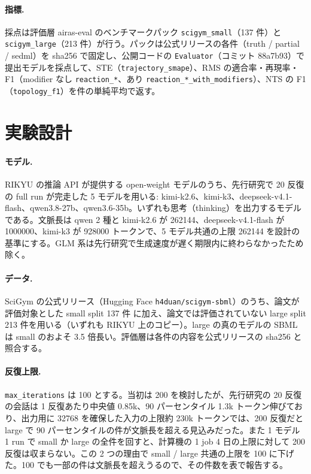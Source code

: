 \documentclass{article}
\begin{document}
\paragraph{指標.}
採点は評価層 airas-eval のベンチマークパック \texttt{scigym\_small}（137 件）と \texttt{scigym\_large}（213 件）が行う。パックは公式リリースの各件（truth / partial / sedml）を sha256 で固定し、公開コードの \texttt{Evaluator}（コミット 88a7b93）で提出モデルを採点して、STE（\texttt{trajectory\_smape}）、RMS の適合率・再現率・F1（modifier なし \texttt{reaction\_*}、あり \texttt{reaction\_*\_with\_modifiers}）、NTS の F1（\texttt{topology\_f1}）を件の単純平均で返す。

\section{実験設計}
\label{sec:design}
\paragraph{モデル.}
RIKYU の推論 API が提供する open-weight モデルのうち、先行研究で 20 反復の full run が完走した 5 モデルを用いる: kimi-k2.6、kimi-k3、deepseek-v4.1-flash、qwen3.8-27b、qwen3.6-35b。いずれも思考（thinking）を出力するモデルである。文脈長は qwen 2 種と kimi-k2.6 が 262144、deepseek-v4.1-flash が 1000000、kimi-k3 が 928000 トークンで、5 モデル共通の上限 262144 を設計の基準にする。GLM 系は先行研究で生成速度が遅く期限内に終わらなかったため除く。

\paragraph{データ.}
SciGym の公式リリース（Hugging Face \texttt{h4duan/scigym-sbml}）のうち、論文が評価対象とした small split 137 件 \cite[s1.p2]{duan-2025-measuring} に加え、論文では評価されていない large split 213 件を用いる（いずれも RIKYU 上のコピー）。large の真のモデルの SBML は small のおよそ 3.5 倍長い。評価層は各件の内容を公式リリースの sha256 と照合する。

\paragraph{反復上限.}
\texttt{max\_iterations} は 100 とする。当初は 200 を検討したが、先行研究の 20 反復の会話は 1 反復あたり中央値 0.85k、90 パーセンタイル 1.3k トークン伸びており、出力用に 32768 を確保した入力の上限約 230k トークンでは、200 反復だと large で 90 パーセンタイルの件が文脈長を超える見込みだった。また 1 モデル 1 run で small か large の全件を回すと、計算機の 1 job 4 日の上限に対して 200 反復は収まらない。この 2 つの理由で small / large 共通の上限を 100 に下げた。100 でも一部の件は文脈長を超えうるので、その件数を表で報告する。
\end{document}
